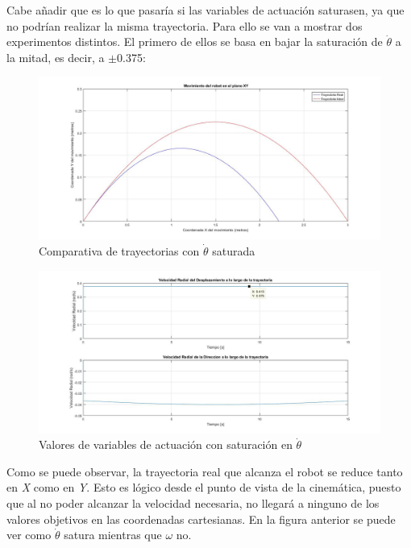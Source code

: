 \documentclass[a4paper,twoside]{article}
\begin{document}
Cabe añadir que es lo que pasaría si las variables de actuación saturasen, ya que no podrían realizar la misma trayectoria. Para ello se van a mostrar dos experimentos distintos. El primero de ellos se basa en bajar la saturación de $\dot{\theta}$ a la mitad, es decir, a $\pm$0.375:

\begin{figure}[h!]
	\centering
	\includegraphics[width=1\textwidth]{parab_4}
	\caption{Comparativa de trayectorias con $\dot{\theta}$ saturada}
\end{figure}
\newpage
\begin{figure}[h!]
	\centering
	\includegraphics[width=1\textwidth]{parab_5}
	\caption{Valores de variables de actuación con saturación en $\dot{\theta}$}
\end{figure}

Como se puede observar, la trayectoria real que alcanza el robot se reduce tanto en \textit{X} como en \textit{Y}. Esto es lógico desde el punto de vista de la cinemática, puesto que al no poder alcanzar la velocidad necesaria, no llegará a ninguno de los valores objetivos en las coordenadas cartesianas. En la figura anterior se puede ver como $\dot{\theta}$ satura mientras que $\omega$ no.\\
\end{document}
